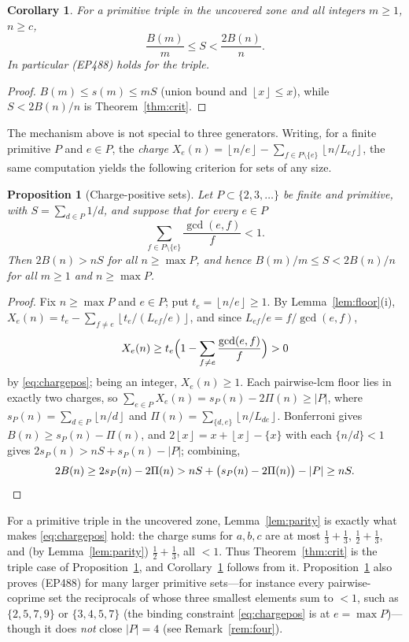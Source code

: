 \documentclass[11pt]{article}
\newtheorem{proposition}[theorem]{Proposition}
\newtheorem{corollary}[theorem]{Corollary}
\theoremstyle{remark}
\newcommand{\floor}[1]{\left\lfloor #1 \right\rfloor}
\begin{document}
\begin{corollary}\label{cor:orderfree}
For a primitive triple in the uncovered zone and all integers $m\ge 1$,
$n\ge c$,
\[
  \frac{B(m)}{m}\le S<\frac{2B(n)}{n}.
\]
In particular (EP488) holds for the triple.
\end{corollary}
\begin{proof}
$B(m)\le s(m)\le mS$ (union bound and $\floor x\le x$), while $S<2B(n)/n$ is
Theorem~\ref{thm:crit}.
\end{proof}

The mechanism above is not special to three generators. Writing, for a finite
primitive $P$ and $e\in P$, the \emph{charge}
$X_e(n)=\floor{n/e}-\sum_{f\in P\setminus\{e\}}\floor{n/L_{ef}}$, the same
computation yields the following criterion for sets of any size.

\begin{proposition}[Charge-positive sets]\label{prop:chargepos}
Let $P\subset\{2,3,\dots\}$ be finite and primitive, with $S=\sum_{d\in P}1/d$,
and suppose that for every $e\in P$
\begin{equation}\label{eq:chargepos}
  \sum_{f\in P\setminus\{e\}}\frac{\gcd(e,f)}{f}<1.
\end{equation}
Then $2B(n)>nS$ for all $n\ge\max P$, and hence $B(m)/m\le S<2B(n)/n$ for all
$m\ge 1$ and $n\ge\max P$.
\end{proposition}
\begin{proof}
Fix $n\ge\max P$ and $e\in P$; put $t_e=\floor{n/e}\ge 1$. By
Lemma~\ref{lem:floor}(i), $X_e(n)=t_e-\sum_{f\ne e}\floor{t_e/(L_{ef}/e)}$, and
since $L_{ef}/e=f/\gcd(e,f)$,
\[
  X_e(n)\ge t_e\Bigl(1-\sum_{f\ne e}\frac{\gcd(e,f)}{f}\Bigr)>0
\]
by \eqref{eq:chargepos}; being an integer, $X_e(n)\ge 1$. Each pairwise-lcm floor
lies in exactly two charges, so $\sum_{e\in P}X_e(n)=s_P(n)-2\Pi(n)\ge|P|$, where
$s_P(n)=\sum_{d\in P}\floor{n/d}$ and $\Pi(n)=\sum_{\{d,e\}}\floor{n/L_{de}}$.
Bonferroni gives $B(n)\ge s_P(n)-\Pi(n)$, and $2\floor x=x+\floor x-\{x\}$ with
each $\{n/d\}<1$ gives $2s_P(n)>nS+s_P(n)-|P|$; combining,
\[
  2B(n)\ge 2s_P(n)-2\Pi(n)>nS+\bigl(s_P(n)-2\Pi(n)\bigr)-|P|\ge nS.\qedhere
\]
\end{proof}

For a primitive triple in the uncovered zone, Lemma~\ref{lem:parity} is exactly
what makes \eqref{eq:chargepos} hold: the charge sums for $a,b,c$ are at most
$\tfrac13+\tfrac13$, $\tfrac12+\tfrac13$, and (by Lemma~\ref{lem:parity})
$\tfrac12+\tfrac13$, all $<1$. Thus Theorem~\ref{thm:crit} is the triple case of
Proposition~\ref{prop:chargepos}, and Corollary~\ref{cor:orderfree} follows from
it. Proposition~\ref{prop:chargepos} also proves (EP488) for many larger primitive
sets---for instance every pairwise-coprime set the reciprocals of whose three
smallest elements sum to $<1$, such as $\{2,5,7,9\}$ or $\{3,4,5,7\}$ (the binding
constraint \eqref{eq:chargepos} is at $e=\max P$)---though it does \emph{not} close
$|P|=4$ (see Remark~\ref{rem:four}).
\end{document}
